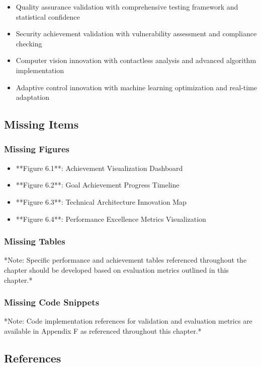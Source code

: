 \documentclass[12pt,a4paper]{article}
\begin{document}
\begin{itemize}
\item Quality assurance validation with comprehensive testing framework and statistical confidence
\item Security achievement validation with vulnerability assessment and compliance checking
\item Computer vision innovation with contactless analysis and advanced algorithm implementation
\item Adaptive control innovation with machine learning optimization and real-time adaptation

\end{itemize}
\subsection{Missing Items}

\subsubsection{Missing Figures}

\begin{itemize}
\item **Figure 6.1**: Achievement Visualization Dashboard
\item **Figure 6.2**: Goal Achievement Progress Timeline
\item **Figure 6.3**: Technical Architecture Innovation Map
\item **Figure 6.4**: Performance Excellence Metrics Visualization

\end{itemize}
\subsubsection{Missing Tables}

*Note: Specific performance and achievement tables referenced throughout the chapter should be developed based on
evaluation metrics outlined in this chapter.*

\subsubsection{Missing Code Snippets}

*Note: Code implementation references for validation and evaluation metrics are available in Appendix F as referenced
throughout this chapter.*

\subsection{References}
\end{document}
